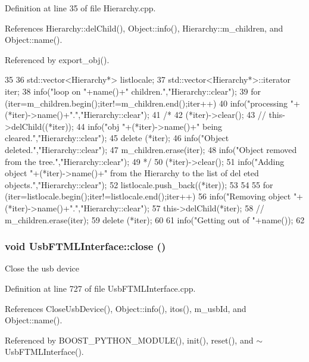 Definition at line 35 of file Hierarchy.cpp.

References Hierarchy::delChild(), Object::info(), Hierarchy::m\_\-children, and Object::name().

Referenced by export\_\-obj().


\begin{DoxyCode}
35                      {
36   std::vector<Hierarchy*> listlocale;
37   std::vector<Hierarchy*>::iterator iter;
38   info("loop on "+name()+" children.","Hierarchy::clear");
39   for (iter=m_children.begin();iter!=m_children.end();iter++){
40       info("processing "+(*iter)->name()+".","Hierarchy::clear");
41 /*
42       (*iter)->clear();
43 //      this->delChild((*iter));
44       info("obj "+(*iter)->name()+" being cleared.","Hierarchy::clear");
45       delete (*iter);
46       info("Object deleted.","Hierarchy::clear");
47       m_children.erase(iter);
48       info("Object removed from the tree.","Hierarchy::clear");
49 */
50     (*iter)->clear();
51     info("Adding object "+(*iter)->name()+" from the Hierarchy to the list of del
      eted objects.","Hierarchy::clear");
52     listlocale.push_back((*iter));
53   }
54 
55   for (iter=listlocale.begin();iter!=listlocale.end();iter++){
56     info("Removing object "+(*iter)->name()+".","Hierarchy::clear");
57     this->delChild(*iter);
58 //    m_children.erase(iter);
59     delete (*iter);
60   }
61   info("Getting out of "+name());
62 }
\end{DoxyCode}
\hypertarget{classUsbFTMLInterface_a1eaa27bd62bc381f60aa837f70a70117}{
\subsubsection[{close}]{\setlength{\rightskip}{0pt plus 5cm}void UsbFTMLInterface::close ()}}
\label{classUsbFTMLInterface_a1eaa27bd62bc381f60aa837f70a70117}
Close the usb device 

Definition at line 727 of file UsbFTMLInterface.cpp.

References CloseUsbDevice(), Object::info(), itos(), m\_\-usbId, and Object::name().

Referenced by BOOST\_\-PYTHON\_\-MODULE(), init(), reset(), and $\sim$UsbFTMLInterface().


